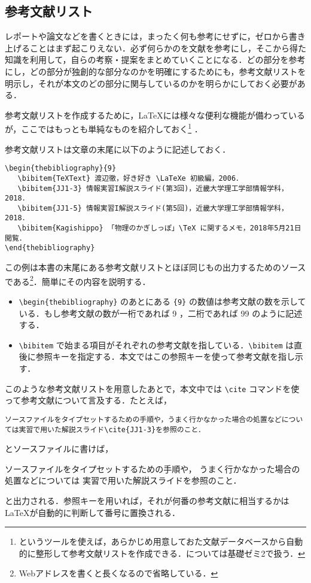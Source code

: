 \subsection{参考文献リスト}

レポートや論文などを書くときには，まったく何も参考にせずに，ゼロから書き上げることはまず起こりえない．必ず何らかのを文献を参考にし，そこから得た知識を利用して，自らの考察・提案をまとめていくことになる．どの部分を参考にし，どの部分が独創的な部分なのかを明確にするためにも，参考文献リストを明示し，それが本文のどの部分に関与しているのかを明らかにしておく必要がある．

参考文献リストを作成するために，\LaTeX には様々な便利な機能が備わっているが，ここではもっとも単純なものを紹介しておく\footnote{\BibTeX というツールを使えば，あらかじめ用意しておた文献データベースから自動的に整形して参考文献リストを作成できる．\BibTeX については基礎ゼミ2で扱う．} ．

参考文献リストは文章の末尾に以下のように記述しておく．
\begin{screen}
\begin{verbatim}
\begin{thebibliography}{9}
   \bibitem{TeXText} 渡辺徹，好き好き \LaTeXe 初級編，2006．
   \bibitem{JJ1-3} 情報実習I解説スライド(第3回)，近畿大学理工学部情報学科，2018．
   \bibitem{JJ1-5} 情報実習I解説スライド(第5回)，近畿大学理工学部情報学科，2018．
   \bibitem{Kagishippo} 「物理のかぎしっぽ」\TeX に関するメモ，2018年5月21日閲覧．
\end{thebibliography}
\end{verbatim}
\end{screen}
この例は本書の末尾にある参考文献リストとほぼ同じもの出力するためのソースである\footnote{Webアドレスを書くと長くなるので省略している．}．簡単にその内容を説明する．
\begin{itemize}
\item \verb|\begin{thebibliography}| のあとにある \verb|{9}| の数値は参考文献の数を示している．もし参考文献の数が一桁であれば 9 ，二桁であれば 99 のように記述する．
\item \verb|\bibitem| で始まる項目がそれぞれの参考文献を指している．\verb|\bibitem| は直後に参照キーを指定する．本文ではこの参照キーを使って参考文献を指し示す．
\end{itemize}
このような参考文献リストを用意したあとで，本文中では \verb|\cite| コマンドを使って参考文献について言及する．たとえば，
\begin{screen}
\begin{verbatim}
ソースファイルをタイプセットするための手順や，うまく行かなかった場合の処置などについては実習で用いた解説スライド\cite{JJ1-3}を参照のこと．
\end{verbatim}
\end{screen}
とソースファイルに書けば，
\begin{screen}
ソースファイルをタイプセットするための手順や，
うまく行かなかった場合の処置などについては
実習で用いた解説スライド\cite{JJ1-3}を参照のこと．
\end{screen}
と出力される．参照キーを用いれば，それが何番の参考文献に相当するかは \LaTeX が自動的に判断して番号に置換される．
